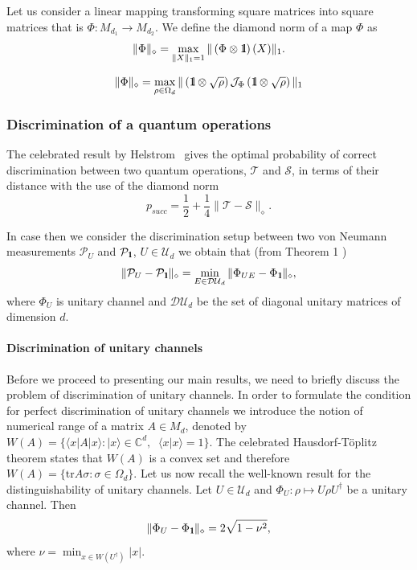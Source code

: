 \documentclass[preprint,12pt, a4paper]{elsarticle}
\newcommand{\ket}[1]{\ensuremath{|#1\rangle}}
\newcommand{\bra}[1]{\ensuremath{\langle#1|}}
\newcommand{\braket}[2]{\ensuremath{\langle{#1}|{#2}\rangle}}
\newcommand{\1}{{\rm 1\hspace{-0.9mm}l}}
\newcommand{\Id}{{\rm 1\hspace{-0.9mm}l}}
\newcommand{\TT}{\mathcal{T}}
\newcommand{\PP}{\mathcal{P}}
\renewcommand{\SS}{\mathcal{S}}
\newcommand{\UU}{\mathcal{U}}
\newcommand{\diaguni}{\ensuremath{\mathcal{DU}}}
\newcommand{\tr}{\mathrm{tr}}
\begin{document}
Let us  consider a  linear mapping transforming  square matrices into square 
matrices 
that is $\Phi: M_{d_1} \to M_{d_2}$. 
 We define the diamond norm of a map $\Phi$ as 
\begin{equation}
\|\Phi\|_\diamond = \max_{\|X\|_1=1} \| \left(\Phi \otimes \1\right) (X) \|_1.
\end{equation}


\begin{equation}
\| \Phi  \|_\diamond =  \max_{\rho \in \Omega_d} \| \left( \Id \otimes \sqrt{\rho} \right) \mathcal{J}_\Phi  \left( \Id \otimes \sqrt{\rho} \right)  \|_1  \end{equation}


\subsubsection{Discrimination of a quantum operations}



The celebrated result by Helstrom~\cite{helstrom1976quantum} gives the optimal  probability of correct discrimination between two quantum operations, $\TT$  and $\SS$, 
in terms of their distance with the use of the diamond norm
\begin{equation}
p_{succ} =  \frac12 + \frac14 \| \TT - \SS \|_\diamond.
\end{equation}

In case then 
we consider the discrimination setup between two von Neumann 
measurements $\PP_U$ and $\PP_\Id$, $U\in \UU_d$ we obtain that (from Theorem 1 \cite{puchala2018strategies})
\begin{equation}
\|\PP_U - \PP_\Id\|_\diamond = \min_{E \in \diaguni_d} \|\Phi_{UE} - 
\Phi_\Id\|_\diamond,
\end{equation}
where $\Phi_U$ is unitary channel and 
$\diaguni_d$ be the set of diagonal unitary matrices of dimension $d$. 



\paragraph{Discrimination of unitary channels}

Before we proceed to presenting our main results, we need to briefly discuss the
problem of discrimination of unitary channels.  In order to formulate the condition for perfect
discrimination of unitary channels we introduce the notion of numerical range of
a matrix $A \in M_d$, denoted by $W(A) =\{\bra{x}A\ket{x}: \ket{x} \in 
\mathbb{C}^d, \;
\;\braket{x}{x}=1\}$. The celebrated Hausdorf-T\"oplitz
theorem states that
$W(A)$ is a convex set and therefore $W(A) =\{\tr A \sigma : \sigma \in \Omega_d
\}$. Let us now recall the well-known result for the
distinguishability of unitary channels.
	Let $U \in \UU_d$ and $\Phi_U: \rho \mapsto U \rho U^\dagger$ be a unitary 
	channel. 
	Then 
	\begin{equation}
	\| \Phi_U  - \Phi_{\1} \|_\diamond = 2 \sqrt{1-\nu^2},
	\end{equation}
	where $\nu = \min_{x \in W(U^\dagger)} |x|  $. 
\end{document}
